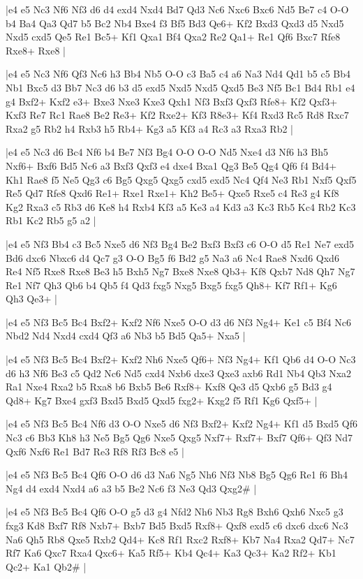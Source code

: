 \whitename{}
\blackname{}
\makegametitle
|e4 e5 Nc3 Nf6 Nf3 d6 d4 exd4 Nxd4 Bd7 Qd3 Nc6 Nxc6 Bxc6 Nd5 Be7 c4 O-O b4 Ba4 Qa3 Qd7 b5 Bc2 Nb4 Bxe4 f3 Bf5 Bd3 Qe6+ Kf2 Bxd3 Qxd3 d5 Nxd5 Nxd5 cxd5 Qe5 Re1 Bc5+ Kf1 Qxa1 Bf4 Qxa2 Re2 Qa1+ Re1 Qf6 Bxc7 Rfe8 Rxe8+ Rxe8  |

\whitename{}
\blackname{}
\makegametitle
|e4 e5 Nc3 Nf6 Qf3 Nc6 h3 Bb4 Nb5 O-O c3 Ba5 c4 a6 Na3 Nd4 Qd1 b5 c5 Bb4 Nb1 Bxc5 d3 Bb7 Nc3 d6 b3 d5 exd5 Nxd5 Nxd5 Qxd5 Be3 Nf5 Bc1 Bd4 Rb1 e4 g4 Bxf2+ Kxf2 e3+ Bxe3 Nxe3 Kxe3 Qxh1 Nf3 Bxf3 Qxf3 Rfe8+ Kf2 Qxf3+ Kxf3 Re7 Rc1 Rae8 Be2 Re3+ Kf2 Rxe2+ Kf3 R8e3+ Kf4 Rxd3 Rc5 Rd8 Rxc7 Rxa2 g5 Rb2 h4 Rxb3 h5 Rb4+ Kg3 a5 Kf3 a4 Rc3 a3 Rxa3 Rb2  |

\whitename{}
\blackname{}
\makegametitle
|e4 e5 Nc3 d6 Bc4 Nf6 b4 Be7 Nf3 Bg4 O-O O-O Nd5 Nxe4 d3 Nf6 h3 Bh5 Nxf6+ Bxf6 Bd5 Nc6 a3 Bxf3 Qxf3 e4 dxe4 Bxa1 Qg3 Be5 Qg4 Qf6 f4 Bd4+ Kh1 Rae8 f5 Ne5 Qg3 c6 Bg5 Qxg5 Qxg5 cxd5 exd5 Nc4 Qf4 Ne3 Rb1 Nxf5 Qxf5 Re5 Qd7 Rfe8 Qxd6 Re1+ Rxe1 Rxe1+ Kh2 Be5+ Qxe5 Rxe5 c4 Re3 g4 Kf8 Kg2 Rxa3 c5 Rb3 d6 Ke8 h4 Rxb4 Kf3 a5 Ke3 a4 Kd3 a3 Kc3 Rb5 Kc4 Rb2 Kc3 Rb1 Kc2 Rb5 g5 a2  |

\whitename{}
\blackname{}
\makegametitle
|e4 e5 Nf3 Bb4 c3 Bc5 Nxe5 d6 Nf3 Bg4 Be2 Bxf3 Bxf3 c6 O-O d5 Re1 Ne7 exd5 Bd6 dxc6 Nbxc6 d4 Qc7 g3 O-O Bg5 f6 Bd2 g5 Na3 a6 Nc4 Rae8 Nxd6 Qxd6 Re4 Nf5 Rxe8 Rxe8 Be3 h5 Bxh5 Ng7 Bxe8 Nxe8 Qb3+ Kf8 Qxb7 Nd8 Qh7 Ng7 Re1 Nf7 Qh3 Qb6 b4 Qb5 f4 Qd3 fxg5 Nxg5 Bxg5 fxg5 Qh8+ Kf7 Rf1+ Kg6 Qh3 Qe3+  |

\whitename{}
\blackname{}
\makegametitle
|e4 e5 Nf3 Bc5 Bc4 Bxf2+ Kxf2 Nf6 Nxe5 O-O d3 d6 Nf3 Ng4+ Ke1 c5 Bf4 Nc6 Nbd2 Nd4 Nxd4 cxd4 Qf3 a6 Nb3 b5 Bd5 Qa5+ Nxa5  |

\whitename{}
\blackname{}
\makegametitle
|e4 e5 Nf3 Bc5 Bc4 Bxf2+ Kxf2 Nh6 Nxe5 Qf6+ Nf3 Ng4+ Kf1 Qb6 d4 O-O Nc3 d6 h3 Nf6 Be3 c5 Qd2 Nc6 Nd5 cxd4 Nxb6 dxe3 Qxe3 axb6 Rd1 Nb4 Qb3 Nxa2 Ra1 Nxe4 Rxa2 b5 Rxa8 b6 Bxb5 Be6 Rxf8+ Kxf8 Qe3 d5 Qxb6 g5 Bd3 g4 Qd8+ Kg7 Bxe4 gxf3 Bxd5 Bxd5 Qxd5 fxg2+ Kxg2 f5 Rf1 Kg6 Qxf5+  |

\whitename{}
\blackname{}
\makegametitle
|e4 e5 Nf3 Bc5 Bc4 Nf6 d3 O-O Nxe5 d6 Nf3 Bxf2+ Kxf2 Ng4+ Kf1 d5 Bxd5 Qf6 Nc3 c6 Bb3 Kh8 h3 Ne5 Bg5 Qg6 Nxe5 Qxg5 Nxf7+ Rxf7+ Bxf7 Qf6+ Qf3 Nd7 Qxf6 Nxf6 Re1 Bd7 Re3 Rf8 Rf3 Bc8 e5  |

\whitename{}
\blackname{}
\makegametitle
|e4 e5 Nf3 Bc5 Bc4 Qf6 O-O d6 d3 Na6 Ng5 Nh6 Nf3 Nb8 Bg5 Qg6 Re1 f6 Bh4 Ng4 d4 exd4 Nxd4 a6 a3 b5 Be2 Nc6 f3 Ne3 Qd3 Qxg2\#  |

\whitename{}
\blackname{}
\makegametitle
|e4 e5 Nf3 Bc5 Bc4 Qf6 O-O g5 d3 g4 Nfd2 Nh6 Nb3 Rg8 Bxh6 Qxh6 Nxc5 g3 fxg3 Kd8 Bxf7 Rf8 Nxb7+ Bxb7 Bd5 Bxd5 Rxf8+ Qxf8 exd5 c6 dxc6 dxc6 Nc3 Na6 Qh5 Rb8 Qxe5 Rxb2 Qd4+ Kc8 Rf1 Rxc2 Rxf8+ Kb7 Na4 Rxa2 Qd7+ Nc7 Rf7 Ka6 Qxc7 Rxa4 Qxc6+ Ka5 Rf5+ Kb4 Qc4+ Ka3 Qc3+ Ka2 Rf2+ Kb1 Qc2+ Ka1 Qb2\#  |


